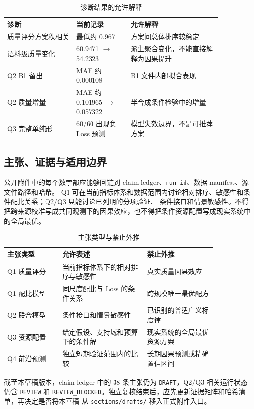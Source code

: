 \begin{table}[htbp]
\centering
\caption{诊断结果的允许解释}
\label{tab:app-diagnostics}
\small
\begin{tabular}{p{0.28\linewidth}p{0.22\linewidth}p{0.37\linewidth}}
\toprule
诊断 & 当前记录 & 允许解释 \\
\midrule
质量评分方案秩相关 & 最低约 0.967 & 方案间总体排序较稳定 \\
语料级质量变化 & 60.9471 $\rightarrow$ 54.2323 & 派生聚合变化，不能直接解释为因果提升 \\
Q2 B1 留出 & MAE 约 0.000108 & B1 文件内部拟合表现 \\
Q2 质量增量 & MAE 约 0.101965 $\rightarrow$ 0.057322 & 半合成条件检验中的增量 \\
Q3 完整单纯形 & 60/60 出现负 Loss 预测 & 模型失效边界，不是可推荐方案 \\
\bottomrule
\end{tabular}
\end{table}

\subsection{主张、证据与适用边界}
\label{app-claim-boundaries}

公开附件中的每个数字都应能够回链到 claim ledger、\texttt{run\_id}、数据 manifest、源文件路径和哈希。
Q1 可在当前指标体系和数据范围内讨论相对排序、敏感性和条件配比关系；Q2/Q3 只能讨论已列明的分项验证、
条件接口和情景敏感性。不得把跨来源校准写成共同观测下的因果效应，也不得把条件资源配置写成现实系统中的全局最优。

\begin{table}[htbp]
\centering
\caption{主张类型与禁止外推}
\label{tab:app-claim-boundaries}
\small
\begin{tabular}{p{0.22\linewidth}p{0.34\linewidth}p{0.29\linewidth}}
\toprule
主张类型 & 允许表述 & 禁止外推 \\
\midrule
Q1 质量评分 & 当前指标体系下的相对排序与敏感性 & 真实质量因果效应 \\
Q1 配比模型 & 同尺度配比与 Loss 的条件关系 & 跨规模唯一最优配方 \\
Q2 联合模型 & 条件接口和情景敏感性 & 已识别的普适广义标度律 \\
Q3 资源配置 & 给定假设、支持域和预算下的条件解 & 现实系统的全局最优资源方案 \\
Q4 前沿预测 & 独立短期验证范围内的比较 & 长期因果预测或精确置信区间 \\
\bottomrule
\end{tabular}
\end{table}

截至本草稿版本，claim ledger 中的 38 条主张仍为 \texttt{DRAFT}，Q2/Q3 相关运行状态仍含
\texttt{REVIEW} 和 \texttt{REVIEW\_BLOCKED}。独立复核结束后，应先更新证据矩阵和哈希清单，再决定是否将本草稿
从 \texttt{sections/drafts/} 移入正式附件入口。
